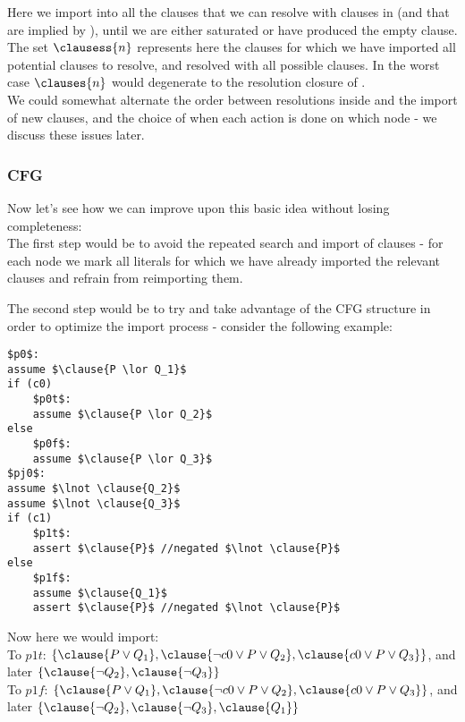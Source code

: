 \noindent 
Here we import into  all the clauses that we can resolve with clauses in  (and that are implied by ), until we are either saturated or have produced the empty clause. The set $\clausess{n}$ represents here the clauses for which we have imported all potential clauses to resolve, and resolved with all possible clauses.
In the worst case $\clauses{n}$ would degenerate to the resolution closure of .\\
We could somewhat alternate the order between resolutions inside  and the import of new clauses, and the choice of when each action is done on which node - we discuss these issues later.

\subsubsection{CFG}
Now let's see how we can improve upon this basic idea without losing completeness:\\
The first step would be to avoid the repeated search and import of clauses - for each node we mark all literals for which we have already imported the relevant clauses and refrain from reimporting them.

The second step would be to try and take advantage of the CFG structure in order to optimize the import process - consider the following example:

\begin{lstlisting}[mathescape]
$p0$: 
assume $\clause{P \lor Q_1}$
if (c0)
	$p0t$:
	assume $\clause{P \lor Q_2}$
else
	$p0f$:
	assume $\clause{P \lor Q_3}$
$pj0$:
assume $\lnot \clause{Q_2}$
assume $\lnot \clause{Q_3}$
if (c1)
	$p1t$:
	assert $\clause{P}$ //negated $\lnot \clause{P}$
else
	$p1f$:
	assume $\clause{Q_1}$
	assert $\clause{P}$ //negated $\lnot \clause{P}$
\end{lstlisting}

Now here we would import:\\
To $p1t$: $\{ \clause{P \lor Q_1}, \clause{\lnot c0 \lor P \lor Q_2}, \clause{c0 \lor P \lor Q_3}\}$, and later $\{\clause{\lnot Q_2}, \clause{\lnot Q_3} \}$ \\
To $p1f$: $\{ \clause{P \lor Q_1}, \clause{\lnot c0 \lor P \lor Q_2}, \clause{c0 \lor P \lor Q_3}\}$, and later $\{\clause{\lnot Q_2}, \clause{\lnot Q_3}, \clause{Q_1} \}$ 

